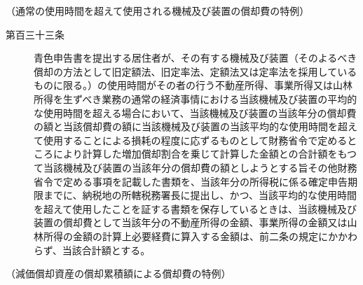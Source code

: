 \documentclass[twocolumn,a4j,10pt]{ltjtarticle}
\begin{document}
\noindent\hspace{10pt}（通常の使用時間を超えて使用される機械及び装置の償却費の特例）
\begin{description}
\item[第百三十三条]青色申告書を提出する居住者が、その有する機械及び装置（そのよるべき償却の方法として旧定額法、旧定率法、定額法又は定率法を採用しているものに限る。）の使用時間がその者の行う不動産所得、事業所得又は山林所得を生ずべき業務の通常の経済事情における当該機械及び装置の平均的な使用時間を超える場合において、当該機械及び装置の当該年分の償却費の額と当該償却費の額に当該機械及び装置の当該平均的な使用時間を超えて使用することによる損耗の程度に応ずるものとして財務省令で定めるところにより計算した増加償却割合を乗じて計算した金額との合計額をもつて当該機械及び装置の当該年分の償却費の額としようとする旨その他財務省令で定める事項を記載した書類を、当該年分の所得税に係る確定申告期限までに、納税地の所轄税務署長に提出し、かつ、当該平均的な使用時間を超えて使用したことを証する書類を保存しているときは、当該機械及び装置の償却費として当該年分の不動産所得の金額、事業所得の金額又は山林所得の金額の計算上必要経費に算入する金額は、前二条の規定にかかわらず、当該合計額とする。
\end{description}
\noindent\hspace{10pt}（減価償却資産の償却累積額による償却費の特例）
\end{document}
